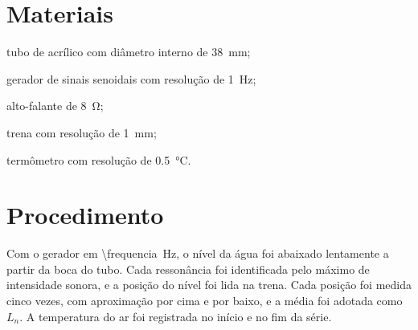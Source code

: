 \section{Materiais}

\begin{alineas}
  \item tubo de acrílico com diâmetro interno de \qty{38}{\milli\metre};
  \item gerador de sinais senoidais com resolução de \qty{1}{\hertz};
  \item alto-falante de \qty{8}{\ohm};
  \item trena com resolução de \qty{1}{\milli\metre};
  \item termômetro com resolução de \qty{0.5}{\celsius}.
\end{alineas}

\section{Procedimento}

Com o gerador em \qty{\frequencia}{\hertz}, o nível da água foi abaixado lentamente a partir da boca do tubo. Cada ressonância foi identificada pelo máximo de intensidade sonora, e a posição do nível foi lida na trena. Cada posição foi medida cinco vezes, com aproximação por cima e por baixo, e a média foi adotada como $L_n$. A temperatura do ar foi registrada no início e no fim da série.
